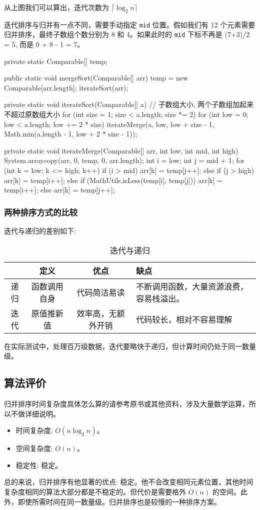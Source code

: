 从上图我们可以算出，迭代次数为 $\lceil \log_2 n \rceil$

迭代排序与归并有一点不同，需要手动指定 \texttt{mid} 位置。假如我们有 12 个元素需要归并排序，最终子数组个数分别为 8 和 4。如果此时的 \texttt{mid} 下标不再是 (7+3)/2 = 5, 而是 0 + 8 - 1 = 7。

\begin{Java}
private static Comparable[] temp;

public static void mergeSort(Comparable[] arr) {
    temp = new Comparable[arr.length];
    iterateSort(arr);
}

private static void iterateSort(Comparable[] a) {
    // 子数组大小, 两个子数组加起来不超过原数组大小
    for (int size = 1; size < a.length; size *= 2) {
        for (int low = 0; low < a.length; low += 2 * size) {
            iterateMerge(a, low, low + size - 1, Math.min(a.length - 1, low + 2 * size - 1));
        }
    }
}

private static void iterateMerge(Comparable[] arr, int low, int mid, int high) {
    System.arraycopy(arr, 0, temp, 0, arr.length);
    int i = low;
    int j = mid + 1;
    for (int k = low; k <= high; k++) {
        if (i > mid) arr[k] = temp[j++];
        else if (j > high) arr[k] = temp[i++];
        else if (MathUtils.isLess(temp[i], temp[j]))
            arr[k] = temp[i++];
        else
            arr[k] = temp[j++];
    }
}
\end{Java}

\subsubsection*{两种排序方式的比较}

迭代与递归的差别如下:
\begin{table}[H]
    \centering
    \caption{迭代与递归}
    \label{table:迭代与递归}
    \setlength{\tabcolsep}{4mm}
    \begin{tabular}{c|ccp{5cm}}
        \toprule
        \textbf{} & \textbf{定义} & \textbf{优点} & \textbf{缺点} \\
        \midrule
        递归 & 函数调用自身 & 代码简洁易读 & 不断调用函数，大量资源浪费，容易栈溢出。 \\
        \midrule
        迭代 & 原值推新值 & 效率高，无额外开销 & 代码较长，相对不容易理解 \\
        \bottomrule
    \end{tabular}
\end{table}

在实际测试中，处理百万级数据，迭代要略快于递归，但计算时间仍处于同一数量级。

\subsection{算法评价}

归并排序时间复杂度具体怎么算的请参考原书或其他资料，涉及大量数学运算，所以不做详细说明。

\begin{itemize}
  \item 时间复杂度: $O(n\log_2 n)$。
  \item 空间复杂度: $O(n)$。
  \item 稳定性: 稳定。
\end{itemize}

总的来说，归并排序有他显著的优点: 稳定。他不会改变相同元素位置，其他时间复杂度相同的算法大部分都是不稳定的。但代价是需要格外 $O(n)$ 的空间。此外，即使所需时间在同一数量级。归并排序也是较慢的一种排序方案。

\newpage